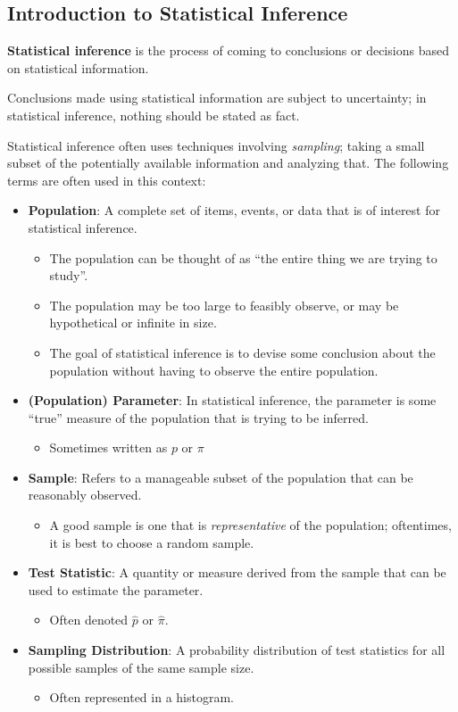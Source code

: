 \documentclass[10pt]{article}
\newenvironment{definition}[1][]{\begin{tcolorbox}[colframe=_orange,colback=_orange2,title=Definition. \ifthenelse{\isempty{#1}}{}{(#1)}
]}{\end{tcolorbox}}
\newcommand{\spacer}[0]{\par\vspace{0.1in}}
\begin{document}
\subsection{Introduction to Statistical Inference}
\begin{definition}
    \textbf{Statistical inference} is the process of coming to conclusions or decisions based on statistical information.
\end{definition}
Conclusions made using statistical information are subject to uncertainty; in statistical inference, nothing should be stated as fact.
\spacer
Statistical inference often uses techniques involving \textit{sampling}; taking a small subset of the potentially available information and analyzing that. The following terms are often used in this context:
\begin{itemize}
    \item \textbf{Population}: A complete set of items, events, or data that is of interest for statistical inference.
    \begin{itemize}
        \item The population can be thought of as ``the entire thing we are trying to study''.
        \item The population may be too large to feasibly observe, or may be hypothetical or infinite in size.
        \item The goal of statistical inference is to devise some conclusion about the population without having to observe the entire population.
    \end{itemize}
    \item \textbf{(Population) Parameter}: In statistical inference, the parameter is some ``true'' measure of the population that is trying to be inferred.
    \begin{itemize}
        \item Sometimes written as $p$ or $\pi$
    \end{itemize}
    \item \textbf{Sample}: Refers to a manageable subset of the population that can be reasonably observed.
    \begin{itemize}
        \item A good sample is one that is \textit{representative} of the population; oftentimes, it is best to choose a random sample.
    \end{itemize}
    \item \textbf{Test Statistic}: A quantity or measure derived from the sample that can be used to estimate the parameter.
    \begin{itemize}
        \item Often denoted $\hat p$ or $\hat \pi$.
    \end{itemize}
    \item \textbf{Sampling Distribution}: A probability distribution of test statistics for all possible samples of the same sample size.
    \begin{itemize}
        \item Often represented in a histogram.
    \end{itemize}
\end{itemize}
\end{document}
